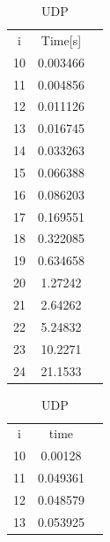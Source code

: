 \documentclass[fleqn, a4paper. 12pt]{ltjsarticle}
\begin{document}
  

      \begin{table}[htbp]
        \centering
        \begin{subtable}[b]{0.4\textwidth}
            \centering
            \begin{tabular}{|c|c|c|}
              \cline{1-2}
              i  & Time{[}s{]} &  \\ \cline{1-2}
              10 & 0.003466    &  \\ \cline{1-2}
              11 & 0.004856    &  \\ \cline{1-2}
              12 & 0.011126    &  \\ \cline{1-2}
              13 & 0.016745    &  \\ \cline{1-2}
              14 & 0.033263    &  \\ \cline{1-2}
              15 & 0.066388    &  \\ \cline{1-2}
              16 & 0.086203    &  \\ \cline{1-2}
              17 & 0.169551    &  \\ \cline{1-2}
              18 & 0.322085    &  \\ \cline{1-2}
              19 & 0.634658    &  \\ \cline{1-2}
              20 & 1.27242     &  \\ \cline{1-2}
              21 & 2.64262     &  \\ \cline{1-2}
              22 & 5.24832     &  \\ \cline{1-2}
              23 & 10.2271     &  \\ \cline{1-2}
              24 & 21.1533     &  \\ \cline{1-2}
            \end{tabular}
            \caption{UDP}
            \label{tab:table1}
        \end{subtable}
        \hfill
        \begin{subtable}[b]{0.4\textwidth}
            \centering
            \begin{tabular}{|c|c|c|}
              \cline{1-2}
              i  & time     &  \\ \cline{1-2}
              10 & 0.00128  &  \\ \cline{1-2}
              11 & 0.049361 &  \\ \cline{1-2}
              12 & 0.048579 &  \\ \cline{1-2}
              13 & 0.053925 &  \\ \cline{1-2}

\end{tabular}
\end{subtable}
\end{table}
\end{document}
